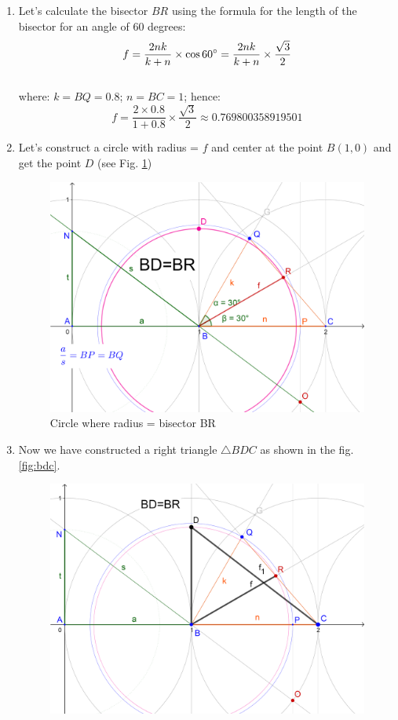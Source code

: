 \documentclass[12pt, letterpaper, oneside]{report}
\begin{document}
\begin{enumerate}
	\item Let's calculate the bisector $BR$ using the formula for the length of the bisector for an angle of 60 degrees:	
\begin{equation}
f=\frac{2nk}{k+n}\times \cos 60\degree = \frac{2nk}{k+n}\times\frac{\sqrt{3}}{2}
\end{equation}\\
	where:  $k=BQ=0.8$; $n=BC=1$; hence:
\begin{equation}	
f=\frac{2\times0.8}{1+0.8}\times\frac{\sqrt{3}}{2}\approx 0.769800358919501
\end{equation}
	\item Let's construct a circle with radius = $f$ and center at the point $B(1,0)$ and get the point $D$ (see Fig. \ref{circle})
\begin{figure}[h]
	\centerline{\includegraphics[scale=0.2]{img/bdBR.png}}
	\caption{Circle where radius = bisector BR}
	\label{circle}
\end{figure} 	
\newpage
	\item Now we have constructed a right triangle $\triangle BDC$ as shown in the fig. \ref{fig:bdc}. 
\begin{figure}[h]
	\centerline{\includegraphics[scale=0.14]{img/BDC.png}}

\end{figure}
\end{enumerate}
\end{document}
